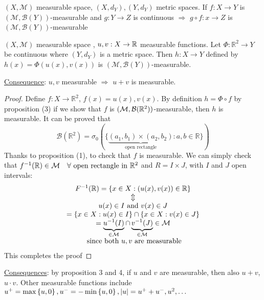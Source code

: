 \begin{proposition}
    \((X, \mathcal{M})\) measurable space, \((X, d_Y), (Y, d_Y)\) metric spaces. 
    If \(f: X \to Y\) is \((\mathcal{M}, \mathcal{B}(Y))\)-measurable and \(g : Y \to Z\) is continuous \(\Rightarrow\) \(g \circ f : x \to Z\) is \((\mathcal{M}, \mathcal{B}(Y))\)-measurable
\end{proposition}
\begin{proposition}
    \((X, \mathcal{M})\) measurable space , \(u,v : X \to  \mathbb{R}\) measurable functions.
    Let \(\Phi : \mathbb{R}^2 \to Y\) be continuous where \((Y, d_Y)\) is a metric space. Then \(h: X\to Y\) defined by \(h(x) = \Phi(u(x), v(x))\) is \((\mathcal{M}, \mathcal{B}(Y))\)-measurable.
\end{proposition}
\noindent\underline{Consequence}: \(u, v\) measurable \(\Rightarrow\) \(u+v\) is measurable.
\begin{proof}
    Define \(f: X \to \mathbb{R}^2\), \(f(x) = u(x), v(x)\). By definition \(h = \Phi \circ f\) by proposition (3) if we show that \(f\) is \((\mathcal{M},\mathcal{B}(\mathbb{R}^2))\)-measurable, then \(h\) is measurable. It can be proved that \[\mathcal{B}(\mathbb{R}^2) = \sigma_0 (\lbrace \underbrace{(a_1, b_1) \times (a_2, b_2)}_{\mbox{open rectangle}}: a,b \in \mathbb{R}\rbrace)\]
    Thanks to proposition (1), to check that \(f\) is measurable. We can simply check that
    \(f^{-1}(\mathbb{R}) \in \mathcal{M} \quad \forall \mbox{ open rectangle in }\mathbb{R}^2\) and
    \(R = I \times J\), with \(I\) and \(J\) open intervals:
    \[
        \begin{array}{c}
            F^{-1}(\mathbb{R}) = \left\lbrace x \in X : (u(x), v(x)) \in \mathbb{R} \right\rbrace \\
            \Updownarrow \\
            u(x) \in I \mbox{ and } v(x) \in J \\
            = \left\{ x \in X : u(x) \in I \right\} \cap \left\{ x \in X : v(x) \in J \right\} \\
            = \underbrace{u^{-1}(I)}_{\in \mathcal{M}} \cap \underbrace{v^{-1}(J)}_{\in \mathcal{M}} \in \mathcal{M} \\
            \mbox{ since both }u,v \mbox{ are measurable}
        \end{array}
    \]
    This completes the proof
\end{proof}
\noindent\underline{Consequences}: by proposition 3 and 4, if \(u\) and \(v\) are measurable, then also \(u+v\), \(u \cdot v\). Other measurable functions include \(u^+ = \max\left\{ u, 0 \right\}, u^- =- \min\left\{u,0\right\}, \abs{u} = u^+ + u^-, u^2, \ldots\)

